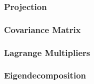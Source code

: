 \subsubsection{Projection}
\clearpage



\subsubsection{Covariance Matrix}
\clearpage



\subsubsection{Lagrange Multipliers}
\clearpage


\subsubsection{Eigendecomposition}
\clearpage

